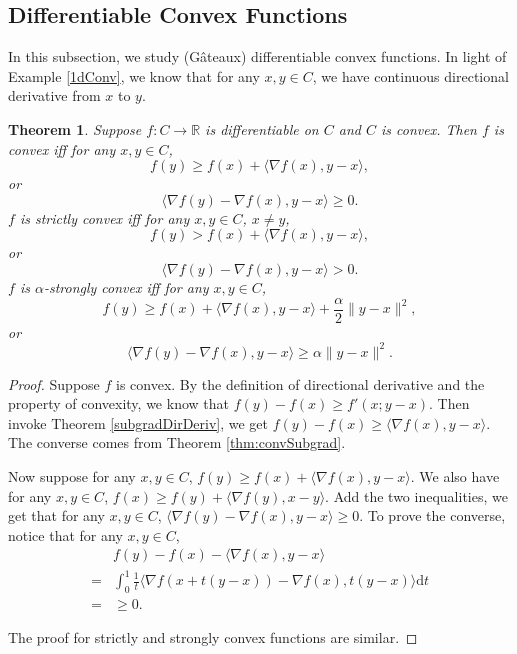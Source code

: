 \documentclass[openany]{book}
\newtheorem{theorem}{Theorem}[chapter]
\theoremstyle{definition}
\theoremstyle{remark}
\begin{document}
\subsection{Differentiable Convex Functions}
In this subsection, we study (G\^{a}teaux) differentiable convex functions. In light of Example \ref{1dConv}, we know that for any $x,y\in C$, we have continuous directional derivative from $x$ to $y$.

\begin{theorem}
    Suppose $f:C\rightarrow\mathbb{R}$ is differentiable on $C$ and $C$ is convex. Then $f$ is convex iff for any $x,y\in C$,
    \begin{equation}\label{convFO1}
    f(y)\ge f(x)+\langle\nabla f(x),y-x\rangle,
    \end{equation}
    or
    \begin{equation}\label{convFO2}
    \langle\nabla f(y)-\nabla f(x),y-x\rangle\ge0.
    \end{equation}
    $f$ is strictly convex iff for any $x,y\in C$, $x\ne y$,
    \begin{equation}\label{sConvFO1}
    f(y)> f(x)+\langle\nabla f(x),y-x\rangle,
    \end{equation}
    or
    \begin{equation}\label{sConvFO2}
    \langle\nabla f(y)-\nabla f(x),y-x\rangle>0.
    \end{equation}
    $f$ is $\alpha$-strongly convex iff for any $x,y\in C$,
    \begin{equation}\label{strConvFO1}
    f(y)\ge f(x)+\langle\nabla f(x),y-x\rangle+\frac{\alpha}{2}\|y-x\|^2,
    \end{equation}
    or
    \begin{equation}\label{strConvFO2}
    \langle\nabla f(y)-\nabla f(x),y-x\rangle\ge\alpha\|y-x\|^2.
    \end{equation}
\end{theorem}
\begin{proof}
    Suppose $f$ is convex. By the definition of directional derivative and the property of convexity, we know that $f(y)-f(x)\ge f'(x;y-x)$. Then invoke Theorem \ref{subgradDirDeriv}, we get $f(y)-f(x)\ge \langle\nabla f(x),y-x\rangle$. The converse comes from Theorem \ref{thm:convSubgrad}.

    Now suppose for any $x,y\in C$, $f(y)\ge f(x)+\langle\nabla f(x),y-x\rangle$. We also have for any $x,y\in C$, $f(x)\ge f(y)+\langle\nabla f(y),x-y\rangle$. Add the two inequalities, we get that for any $x,y\in C$, $\langle\nabla f(y)-\nabla f(x),y-x\rangle\ge0$. To prove the converse, notice that for any $x,y\in C$,
    \begin{equation*}
        \begin{array}{rl}
             & f(y)-f(x)-\langle\nabla f(x),y-x\rangle \\
            = & \displaystyle\int_0^1 \frac{1}{t}\langle\nabla f(x+t(y-x))-\nabla f(x),t(y-x)\rangle\mathrm{d}t \\
            = & \ge 0.
        \end{array}
    \end{equation*}

    The proof for strictly and strongly convex functions are similar.
\end{proof}
\end{document}
